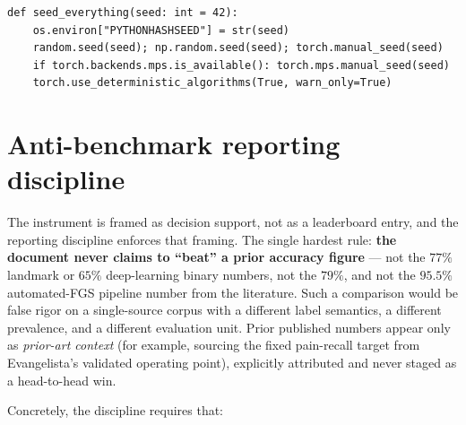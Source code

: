 \begin{verbatim}
def seed_everything(seed: int = 42):
    os.environ["PYTHONHASHSEED"] = str(seed)
    random.seed(seed); np.random.seed(seed); torch.manual_seed(seed)
    if torch.backends.mps.is_available(): torch.mps.manual_seed(seed)
    torch.use_deterministic_algorithms(True, warn_only=True)
\end{verbatim}

\section{Anti-benchmark reporting discipline}
\label{sec:anti-benchmark}

The instrument is framed as decision support, not as a leaderboard entry, and the reporting
discipline enforces that framing. The single hardest rule: \textbf{the document never claims to
``beat'' a prior accuracy figure} --- not the $77\%$ landmark or $65\%$ deep-learning binary
numbers, not the $79\%$, and not the $95.5\%$ automated-FGS pipeline number from the
literature. Such a comparison would be false rigor on a single-source corpus with a different
label semantics, a different prevalence, and a different evaluation unit. Prior published
numbers appear only as \emph{prior-art context} (for example, sourcing the fixed pain-recall
target from Evangelista's validated operating point), explicitly attributed and never staged as
a head-to-head win.

Concretely, the discipline requires that:


